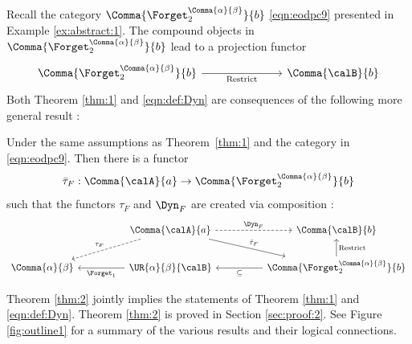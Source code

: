 \documentclass[12pt,oneside]{article}
\begin{document}
Recall the category $\Comma{ \Forget_2^{ \Comma{\alpha}{\beta} } }{ b }$ \eqref{eqn:eodpc9} presented in Example \ref{ex:abstract:1}. The compound objects in $\Comma{ \Forget_2^{ \Comma{\alpha}{\beta} } }{ b }$ lead to a projection functor
%
\[\begin{tikzcd} \Comma{ \Forget_2^{ \Comma{\alpha}{\beta} } }{ b } \arrow[rrr, "\text{Restrict}"'] &&& \Comma{\calB}{b} \end{tikzcd}\]
%
Both Theorem \ref{thm:1} and \eqref{eqn:def:Dyn} are consequences of the following more general result :

\begin{theorem} \label{thm:2}
	Under the same assumptions as Theorem~\ref{thm:1}  and the category in  \eqref{eqn:eodpc9}. Then there is a functor
	\[ \bar{\tau}_F : \Comma{\calA}{a} \to \Comma{ \Forget_2^{ \Comma{\alpha}{\beta} } }{ b } \]
	such that the functors $\tau_{F}$ and $\Dyn_{F}$ are created via composition :
	\begin{equation}  \label{eqn:thm:2}
		\begin{tikzcd}
			&& \Comma{\calA}{a} \arrow[dll, "\tau_F"', dashed] \arrow[rr, "\Dyn_F", dashed] \arrow[drr, "\bar{\tau}_F"] && \Comma{\calB}{b} \\
			\Comma{\alpha}{\beta} && \UR{\alpha}{\beta}{\calB} \arrow[ll, "\Forget_1"] && \Comma{ \Forget_2^{ \Comma{\alpha}{\beta} } }{b} \arrow[ll, "\subseteq"] \arrow[u, "\text{Restrict}"']
		\end{tikzcd}
	\end{equation}
\end{theorem}

Theorem \ref{thm:2} jointly implies the statements of Theorem \ref{thm:1} and \eqref{eqn:def:Dyn}. Theorem \ref{thm:2} is proved in Section \ref{sec:proof:2}. See Figure \ref{fig:outline1} for a summary of the various results and their logical connections.
\end{document}
